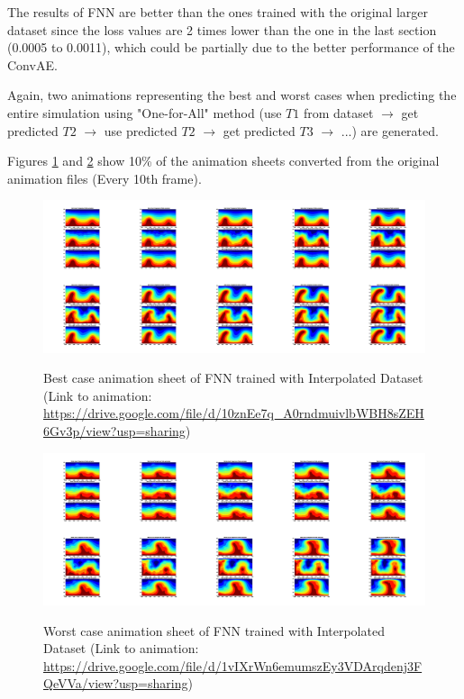 The results of FNN are better than the ones trained with the original larger dataset since the loss values are 2 times lower than the one in the last section (0.0005 to 0.0011), which could be partially due to the better performance of the ConvAE.

Again, two animations representing the best and worst cases when predicting the entire simulation using "One-for-All" method (use $T1$ from dataset $\rightarrow$ get predicted $T2$ $\rightarrow$ use predicted $T2$ $\rightarrow$ get predicted $T3$ $\rightarrow$ ...) are generated.

Figures \ref{figure:FNN_interpolated_best_gif} and \ref{figure:FNN_interpolated_worst_gif} show 10\% of the animation sheets converted from the original animation files (Every 10th frame).

\begin{figure}[H]
    \centering
    \caption{Best case animation sheet of FNN trained with Interpolated Dataset (Link to animation: \url{https://drive.google.com/file/d/10znEe7q_A0rndmuivlbWBH8sZEH6Gv3p/view?usp=sharing})}
    \includegraphics[scale=0.10]{figures/mantle_convection_images/larger_dataset_interpolated/FNN_Best_GIF_sheet.png}
    \label{figure:FNN_interpolated_best_gif}
\end{figure}

\begin{figure}[H]
    \centering
    \caption{Worst case animation sheet of FNN trained with Interpolated Dataset (Link to animation: 
    \url{https://drive.google.com/file/d/1vIXrWn6emumszEy3VDArqdenj3FQeVVa/view?usp=sharing})}
    \includegraphics[scale=0.10]{figures/mantle_convection_images/larger_dataset_interpolated/FNN_Worst_GIF_sheet.png}
    \label{figure:FNN_interpolated_worst_gif}
\end{figure}

